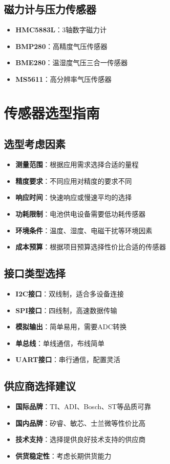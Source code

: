 \documentclass[12pt,UTF8]{ctexbook}
\begin{document}
\subsection{磁力计与压力传感器}
\begin{itemize}[leftmargin=2cm]
	\item \textbf{HMC5883L}：3轴数字磁力计
	\item \textbf{BMP280}：高精度气压传感器
	\item \textbf{BME280}：温湿度气压三合一传感器
	\item \textbf{MS5611}：高分辨率气压传感器
\end{itemize}

\section{传感器选型指南}
\subsection{选型考虑因素}
\begin{itemize}[leftmargin=2cm]
	\item \textbf{测量范围}：根据应用需求选择合适的量程
	\item \textbf{精度要求}：不同应用对精度的要求不同
	\item \textbf{响应时间}：快速响应或慢速平均的选择
	\item \textbf{功耗限制}：电池供电设备需要低功耗传感器
	\item \textbf{环境条件}：温度、湿度、电磁干扰等环境因素
	\item \textbf{成本预算}：根据项目预算选择性价比合适的传感器
\end{itemize}

\subsection{接口类型选择}
\begin{itemize}[leftmargin=2cm]
	\item \textbf{I2C接口}：双线制，适合多设备连接
	\item \textbf{SPI接口}：四线制，高速数据传输
	\item \textbf{模拟输出}：简单易用，需要ADC转换
	\item \textbf{单总线}：单线通信，布线简单
	\item \textbf{UART接口}：串行通信，配置灵活
\end{itemize}

\subsection{供应商选择建议}
\begin{itemize}[leftmargin=2cm]
	\item \textbf{国际品牌}：TI、ADI、Bosch、ST等品质可靠
	\item \textbf{国内品牌}：矽睿、敏芯、士兰微等性价比高
	\item \textbf{技术支持}：选择提供良好技术支持的供应商
	\item \textbf{供货稳定性}：考虑长期供货能力
\end{itemize}

\backmatter
\end{document}
